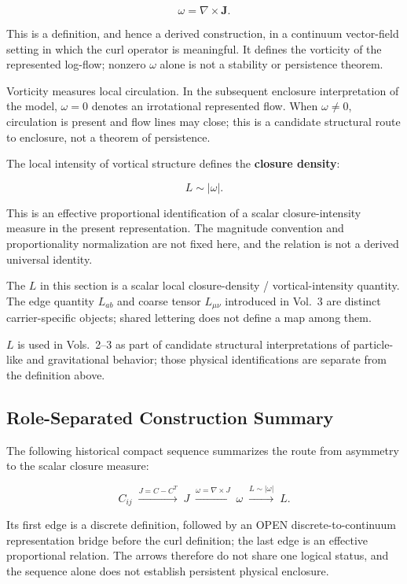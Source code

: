 \begin{equation}
  \omega = \nabla \times \mathbf{J}.
  \label{eq:vorticity}
\end{equation}

This is a definition, and hence a derived construction, in a continuum
vector-field setting in which the curl operator is meaningful. It defines the
vorticity of the represented log-flow; nonzero $\omega$ alone is not a
stability or persistence theorem.

Vorticity measures local circulation.
In the subsequent enclosure interpretation of the model, $\omega=0$ denotes
an irrotational represented flow.  When $\omega\neq0$, circulation is present
and flow lines may close; this is a candidate structural route to enclosure,
not a theorem of persistence.

The local intensity of vortical structure defines the \textbf{closure density}:

\begin{equation}
  L \sim |\omega|.
  \label{eq:closure_density}
\end{equation}

This is an effective proportional identification of a scalar closure-intensity
measure in the present representation. The magnitude convention and
proportionality normalization are not fixed here, and the relation is not a
derived universal identity.

\begin{remark}[Carrier]
The $L$ in this section is a scalar local closure-density / vortical-intensity
quantity. The edge quantity $L_{ab}$ and coarse tensor $L_{\mu\nu}$ introduced
in Vol.~3 are distinct carrier-specific objects; shared lettering does not
define a map among them.
\end{remark}

$L$ is used in Vols.~2--3 as part of candidate structural interpretations of
particle-like and gravitational behavior; those physical identifications are
separate from the definition above.

\subsection{Role-Separated Construction Summary}

The following historical compact sequence summarizes the route from asymmetry
to the scalar closure measure:

\[
  C_{ij}
  \;\xrightarrow{J = C - C^T}\; J
  \;\xrightarrow{\omega = \nabla\times J}\; \omega
  \;\xrightarrow{L \sim |\omega|}\; L.
\]

Its first edge is a discrete definition, followed by an OPEN
discrete-to-continuum representation bridge before the curl definition; the
last edge is an effective proportional relation.  The arrows therefore do not
share one logical status, and the sequence alone does not establish persistent
physical enclosure.
